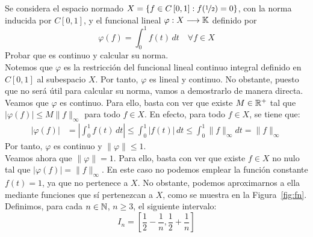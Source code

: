 \begin{ejercicio}
Se considera el espacio normado $X = \{f \in C\left[0, 1\right] : f(\nicefrac{1}{2}) = 0\}$, con la norma inducida por $C\left[0, 1\right]$, y el funcional lineal $\varphi: X \longrightarrow \mathbb{K}$ definido por
\[
\varphi(f) = \int_{0}^1 f(t)\,dt \quad \forall f \in X
\]
Probar que es continuo y calcular su norma.\\

Notemos que $\varphi$ es la restricción del funcional lineal continuo integral definido en $C\left[0, 1\right]$ al subespacio $X$. Por tanto, $\varphi$ es lineal y continuo. No obstante, puesto que no será útil para calcular su norma, vamos a demostrarlo de manera directa.\\

Veamos que $\varphi$ es continuo. Para ello, basta con ver que existe $M \in \mathbb{R}^+$ tal que $|\varphi(f)| \leq M \|f\|_\infty$ para todo $f \in X$. En efecto, para todo $f \in X$, se tiene que:
\begin{align*}
    |\varphi(f)| &= \left|\int_{0}^1 f(t)\,dt\right| \leq \int_{0}^1 |f(t)|\,dt \leq \int_{0}^1 \|f\|_\infty dt = \|f\|_\infty
\end{align*}
Por tanto, $\varphi$ es continuo y $\|\varphi\| \leq 1$.\\

Veamos ahora que $\|\varphi\| = 1$. Para ello, basta con ver que existe $f \in X$ no nulo tal que $|\varphi(f)| = \|f\|_\infty$. En este caso no podemos emplear la función constante $f(t) = 1$, ya que no pertenece a $X$. No obstante, podemos aproximarnos a ella mediante funciones que sí pertenezcan a $X$, como se muestra en la Figura~\ref{fig:fn}. Definimos, para cada $n\in \mathbb{N}$, $n\geq 3$, el siguiente intervalo:
\begin{equation*}
    I_n = \left[\frac{1}{2} - \frac{1}{n}, \frac{1}{2} + \frac{1}{n}\right]
\end{equation*}
\begin{figure}
    \centering
\end{figure}
\end{ejercicio}
